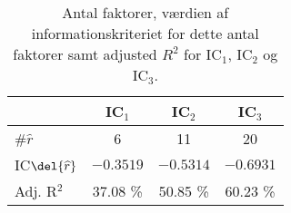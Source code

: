 \begin{table}[h]
\center
\begin{tabular}{lccc}
\toprule
& IC$_1$ & IC$_2$ & IC$_3$ \\ \midrule
\#$\widehat{r}$ & 6 & 11 & 20 \\ 
IC$\del{\widehat{r}}$ & $-0.3519$  & $-0.5314$ & $-0.6931$  \\
Adj. R$^2$ & 37.08 \% & 50.85 \% & 60.23 \% \\ \bottomrule
 \end{tabular}
\caption{Antal faktorer, værdien af informationskriteriet for dette antal faktorer samt adjusted \(R^2\) for IC$_1$, IC$_2$ og IC$_3$.} \label{tab:est_faktor}
\end{table}